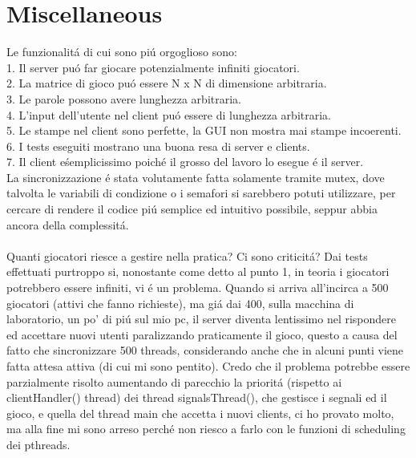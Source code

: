 \chapter{Miscellaneous}{\label{ch:miscellaneous}}
Le funzionalit\'a di cui sono pi\'u orgoglioso sono:
\\
1. Il server pu\'o far giocare potenzialmente infiniti giocatori.
\\
2. La matrice di gioco pu\'o essere N x N di dimensione arbitraria.
\\
3. Le parole possono avere lunghezza arbitraria.
\\
4. L'input dell'utente nel client pu\'o essere di lunghezza arbitraria.
\\
5. Le stampe nel client sono perfette, la GUI non mostra mai stampe incoerenti.
\\
6. I tests eseguiti mostrano una buona resa di server e clients.
\\
7. Il client e\' semplicissimo poich\'e il grosso del lavoro lo esegue \'e il server.
\\

La sincronizzazione \'e stata volutamente fatta solamente tramite mutex, dove talvolta le variabili di condizione o i semafori si sarebbero potuti utilizzare, per cercare di rendere il codice pi\'u semplice ed intuitivo possibile, seppur abbia ancora della complessit\'a.
\\

\\
Quanti giocatori riesce a gestire nella pratica? Ci sono criticit\'a? Dai tests effettuati purtroppo si, nonostante come detto al punto 1, in teoria i giocatori potrebbero essere infiniti, vi \'e un problema. Quando si arriva all'incirca a 500 giocatori (attivi che fanno richieste), ma gi\'a dai 400, sulla macchina di laboratorio, un po' di pi\'u sul mio pc, il server diventa lentissimo nel rispondere ed accettare nuovi utenti paralizzando praticamente il gioco, questo a causa del fatto che sincronizzare 500 threads, considerando anche che in alcuni punti viene fatta attesa attiva (di cui mi sono pentito). Credo che il problema potrebbe essere parzialmente risolto aumentando di parecchio la priorit\'a (rispetto ai clientHandler() thread) dei thread signalsThread(), che gestisce i segnali ed il gioco, e quella del thread main che accetta i nuovi clients, ci ho provato molto, ma alla fine mi sono arreso perch\'e non riesco a farlo con le funzioni di scheduling dei pthreads.

